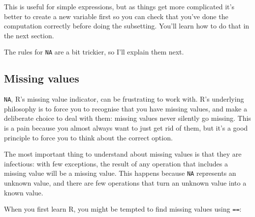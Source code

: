 This is useful for simple expressions, but as things get more
complicated it's better to create a new variable first so you can check
that you've done the computation correctly before doing the subsetting.
You'll learn how to do that in the next section.

The rules for \texttt{NA} are a bit trickier, so I'll explain them next.

\subsection{Missing values}\label{missing-values}

\texttt{NA}, R's missing value indicator, can be frustrating to work
with. R's underlying philosophy is to force you to recognise that you
have missing values, and make a deliberate choice to deal with them:
missing values never silently go missing. This is a pain because you
almost always want to just get rid of them, but it's a good principle to
force you to think about the correct option. 

The most important thing to understand about missing values is that they
are infectious: with few exceptions, the result of any operation that
includes a missing value will be a missing value. This happens because
\texttt{NA} represents an unknown value, and there are few operations
that turn an unknown value into a known value.

\begin{Shaded}
\begin{Highlighting}[]
\StringTok{ }\NormalTok{(}\NormalTok{, }\NormalTok{, }\NormalTok{)}
\StringTok{ }
\StringTok{ }
\StringTok{ }
\end{Highlighting}
\end{Shaded}

When you first learn R, you might be tempted to find missing values
using \texttt{==}:

\begin{Shaded}
\begin{Highlighting}[]
\StringTok{ }
\StringTok{ }
\end{Highlighting}
\end{Shaded}

